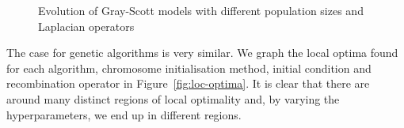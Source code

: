 \begin{figure}[!h]
\centering
            \hfill
            \hfill
            \hfill
            \hfill
            \caption{Evolution of Gray-Scott models with different population sizes and Laplacian operators}
\label{fig:more-fails}
\end{figure}

The case for genetic algorithms is very similar. We graph the local optima found for each algorithm, chromosome initialisation method, initial condition and recombination operator in Figure~\ref{fig:loc-optima}. It is clear that there are around many distinct regions of local optimality and, by varying the hyperparameters, we end up in different regions.\\

